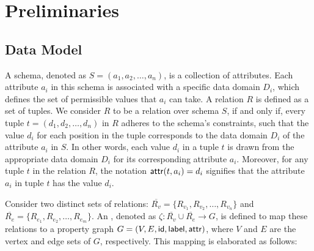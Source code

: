 \section{Preliminaries}
\label{sec:preliminaries}

\subsection{Data Model}
\label{sec:data-model}

A schema, denoted as \(S = (a_1, a_2, \ldots, a_n)\), is a collection of attributes. Each attribute \(a_i\) in this schema is associated with a specific data domain \(D_i\), which defines the set of permissible values that \(a_i\) can take.
A relation \(R\) is defined as a set of tuples. We consider \(R\) to be a relation over schema \(S\), if and only if, every tuple \(t = (d_1, d_2, \ldots, d_n)\) in \(R\) adheres to the schema's constraints, such that the value \(d_i\) for each position in the tuple corresponds to the data domain \(D_i\) of the attribute \(a_i\) in \(S\). In other words, each value \(d_i\) in a tuple \(t\) is drawn from the appropriate data domain \(D_i\) for its corresponding attribute \(a_i\).
Moreover, for any tuple \(t\) in the relation \(R\), the notation \({\mathsf{attr}}(t, a_i) = d_i\) signifies that the attribute \(a_i\) in tuple \(t\) has the value \(d_i\).

Consider two distinct sets of relations: \(\overline{R_v} = \{R_{v_1}, R_{v_2}, \ldots, R_{v_n}\}\) and \(\overline{R_e} = \{R_{e_1}, R_{e_2}, \ldots, R_{e_m}\}\). An \rgmapping, denoted as \(\zeta: \overline{R_v} \cup \overline{R_e} \to G\), is defined to map these relations to a property graph \(G = (V, E, {\mathsf{id}}, {\mathsf{label}}, {\mathsf{attr}})\), where \(V\) and \(E\) are the vertex and edge sets of \(G\), respectively. This mapping is elaborated as follows:

